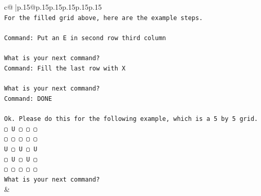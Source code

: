 \documentclass{article}
\begin{document}
{\begin{supertabular}{c@{$\;$}|p{.15\linewidth}@{}p{.15\linewidth}p{.15\linewidth}p{.15\linewidth}p{.15\linewidth}p{.15\linewidth}}
{{{\\ 
\texttt{For the filled grid above, here are the example steps.} \\
\\ 
\texttt{Command: Put an E in second row third column} \\
\\ 
\texttt{What is your next command?} \\
\texttt{Command: Fill the last row with X} \\
\\ 
\texttt{What is your next command?} \\
\texttt{Command: DONE} \\
\\ 
\texttt{Ok. Please do this for the following example, which is a 5 by 5 grid.} \\
\texttt{▢ U ▢ ▢ ▢} \\
\texttt{▢ ▢ ▢ ▢ ▢} \\
\texttt{U ▢ U ▢ U} \\
\texttt{▢ U ▢ U ▢} \\
\texttt{▢ ▢ ▢ ▢ ▢} \\
\texttt{What is your next command?} \\
            }
        }
    }
    & \\ \\


\end{supertabular}}
\end{document}
